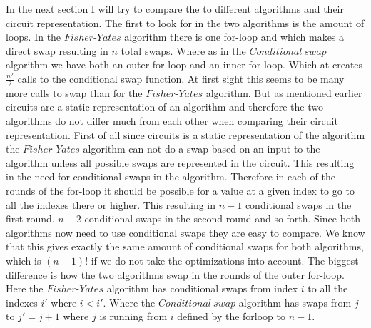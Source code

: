 \documentclass[twoside,11pt,openright]{report}
\begin{document}
\bigskip
In the next section I will try to compare the to different algorithms and their circuit representation. The first to look for in the two algorithms is the amount of loops. In the $Fisher\text{-}Yates$ algorithm there is one for-loop and which makes a direct swap resulting in $n$ total swaps. Where as in the $Conditional~swap$ algorithm we have both an outer for-loop and an inner for-loop. Which at creates $\frac{n^2}{2}$ calls to the conditional swap function. At first sight this seems to be many more calls to swap than for the $Fisher\text{-}Yates$ algorithm. But as mentioned earlier circuits are a static representation of an algorithm and therefore the two algorithms do not differ much from each other when comparing their circuit representation. First of all since circuits is a static representation of the algorithm the $Fisher\text{-}Yates$ algorithm can not do a swap based on an input to the algorithm unless all possible swaps are represented in the circuit. This resulting in the need for conditional swaps in the algorithm. Therefore in each of the rounds of the for-loop it should be possible for a value at a given index to go to all the indexes there or higher. This resulting in $n-1$ conditional swaps in the first round. $n-2$ conditional swaps in the second round and so forth. Since both algorithms now need to use conditional swaps they are easy to compare. We know that this gives exactly the same amount of conditional swaps for both algorithms, which is $(n-1)!$ if we do not take the optimizations into account. The biggest difference is how the two algorithms swap in the rounds of the outer for-loop. Here the $Fisher\text{-}Yates$ algorithm has conditional swaps from index $i$ to all the indexes $i'$ where $i<i'$. Where the $Conditional~swap$ algorithm has swaps from $j$ to $j'= j+1$ where $j$ is running from $i$ defined by the forloop to $n-1$.
\end{document}
